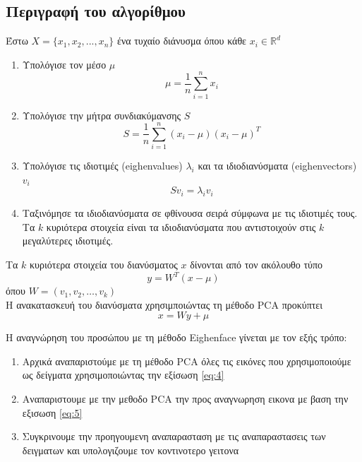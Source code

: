 \subsection{Περιγραφή του αλγορίθμου}\label{subsec:eigenalgo}

Έστω $X = \{x_1, x_2, ..., x_n\}$ ένα τυχαίο διάνυσμα όπου κάθε $x_i \in \mathbb{R}^d$

\begin{enumerate}
    \item Υπολόγισε τον μέσο $\mu$
        \begin{equation}
            \mu = \frac{1}{n}\sum_{i=1}^{n} x_i
            \tag{1}
        \end{equation}

    \item Υπολόγισε την μήτρα συνδιακύμανσης $S$
        \begin{equation}
            S = \frac{1}{n}\sum_{i=1}^{n} (x_i-\mu)(x_i-\mu)^T
            \tag{2}
        \end{equation}

    \item Υπολόγισε τις ιδιοτιμές (eighenvalues) $ \lambda_i $ και τα ιδιοδιανύσματα (eighenvectors) $ v_i $
        \begin{equation}
            Sv_i = \lambda_i v_i
            \tag{3}
        \end{equation}

    \item Ταξινόμησε τα ιδιοδιανύσματα σε φθίνουσα σειρά σύμφωνα με τις ιδιοτιμές τους. Τα $ k $ κυριότερα στοιχεία
        είναι τα ιδιοδιανύσματα που αντιστοιχούν στις $ k $ μεγαλύτερες ιδιοτιμές.
\end{enumerate}

Τα $ k $ κυριότερα στοιχεία του διανύσματος $ x $ δίνονται από τον ακόλουθο τύπο
\begin{equation}
    y = W^T(x-\mu)
    \tag{4}
    \label{eq:4}
\end{equation}όπου
$ W = (v_1, v_2, \ldots, v_k) $
\\
Η ανακατασκευή του διανύσματα χρησιμποιώντας τη μέθοδο PCA προκύπτει
\begin{equation}
    x = Wy + \mu
    \tag{5}
    \label{eq:5}
\end{equation}

Η αναγνώρηση του προσώπου με τη μέθοδο Eighenface γίνεται με τον εξής τρόπο:
\begin{enumerate}
    \item Αρχικά αναπαριστούμε με τη μέθοδο PCA όλες τις εικόνες που χρησιμοποιούμε ως δείγματα
        χρησιμοποιώντας την εξίσωση \ref{eq:4}
    \item Αναπαριστουμε με την μεθοδο PCA την προς αναγνωρηση εικονα με βαση την εξισωση \ref{eq:5}
    \item Συγκρινουμε την προηγουμενη αναπαρασταση με τις αναπαραστασεις των δειγματων και
        υπολογιζουμε τον κοντινοτερο γειτονα
\end{enumerate}

